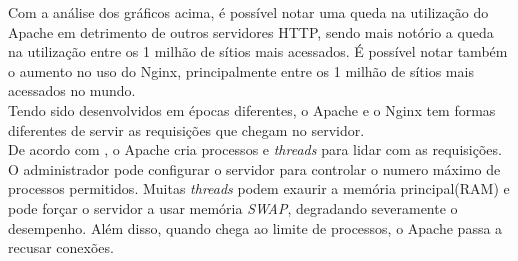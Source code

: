 Com a análise dos gráficos acima, é possível notar uma queda na utilização do Apache em detrimento de outros servidores HTTP, sendo mais notório a queda na utilização entre os 1 milhão de sítios mais acessados. É possível notar também o aumento no uso do Nginx, principalmente entre os 1 milhão de sítios mais acessados no mundo.\\
Tendo sido desenvolvidos em épocas diferentes, o Apache e o Nginx tem formas diferentes de servir as requisições que chegam no servidor.\\
De acordo com , o Apache cria processos e \textit{threads} para lidar com as requisições. O administrador pode configurar o servidor para controlar o numero máximo de processos permitidos. Muitas \textit{threads} podem exaurir a memória principal(RAM) e pode forçar o servidor a usar memória \textit{SWAP}, degradando severamente o desempenho. Além disso, quando chega ao limite de processos, o Apache passa a recusar conexões.